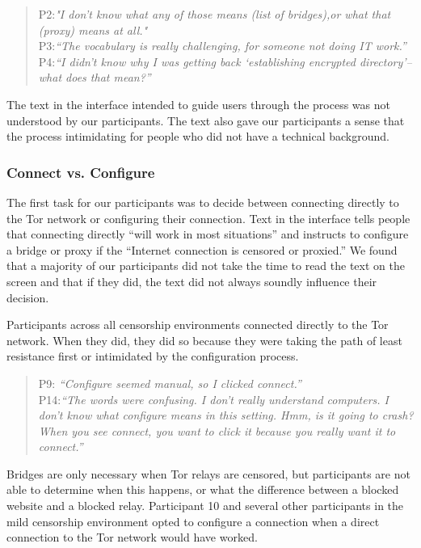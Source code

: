 \documentclass[USenglish,oneside,twocolumn]{article}
\begin{document}
\begin{quotation}
\noindent P2:\textit{"I don't know what any of those means (list of bridges),or what that (proxy)
 means at all."}\\
 
 \noindent P3:\textit{``The vocabulary is really challenging, for someone not doing IT work.''}\\
 
 \noindent P4:\textit{``I didn't know why I was getting back `establishing encrypted directory'--what does that mean?''}\\
\end{quotation} 
The text in the interface intended to guide users through the process was not understood by our participants. The text also gave our participants a sense that the process intimidating for people who did not have a technical background. 

\subsubsection{Connect vs. Configure} 
The first task for our participants was to decide between connecting directly to the Tor network or configuring their connection. Text in the interface tells people that connecting directly ``will work in most situations'' and instructs to configure a bridge or proxy if the ``Internet connection is censored or proxied.'' We found that a majority of our participants did not take the time to read the text on the screen and that if they did, the text did not always soundly influence their decision.

Participants across all censorship environments connected directly to the Tor network. When they did, they did so because they were taking the path of least resistance first or intimidated by the configuration process. 
\begin{quotation}
\noindent P9: \textit{``Configure seemed manual, so I clicked connect.''}\\

\noindent P14:\textit{``The words were confusing. I don't really understand computers. I don't know what configure means in this setting. Hmm, is it going to crash? When you see connect, you want to click it because you really want it to connect.''} 
\end{quotation}

Bridges are only necessary when Tor relays are censored, but participants are not able to determine when this happens, or what the difference between a blocked website and a blocked relay. Participant 10 and several other participants in the mild censorship environment opted to configure a connection when a direct connection to the Tor network would have worked. 
\end{document}
